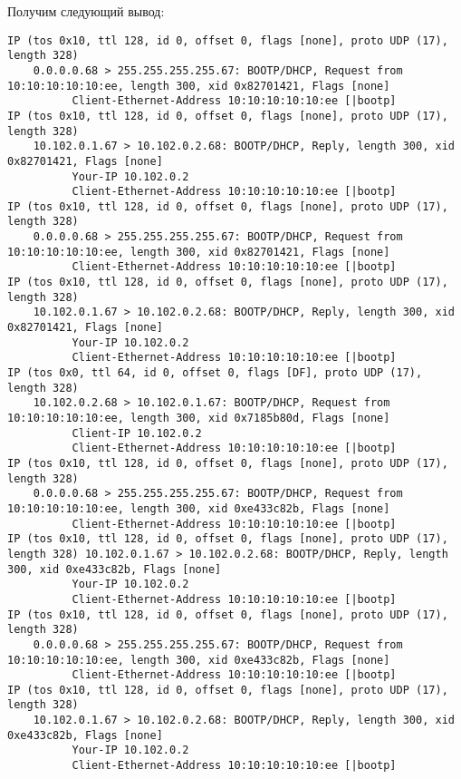 \documentclass[a4paper,12pt]{article}
\begin{document}
Получим следующий вывод:
\begin{Verbatim}
IP (tos 0x10, ttl 128, id 0, offset 0, flags [none], proto UDP (17), length 328) 
	0.0.0.0.68 > 255.255.255.255.67: BOOTP/DHCP, Request from 10:10:10:10:10:ee, length 300, xid 0x82701421, Flags [none]
          Client-Ethernet-Address 10:10:10:10:10:ee [|bootp]
IP (tos 0x10, ttl 128, id 0, offset 0, flags [none], proto UDP (17), length 328) 
	10.102.0.1.67 > 10.102.0.2.68: BOOTP/DHCP, Reply, length 300, xid 0x82701421, Flags [none]
          Your-IP 10.102.0.2
          Client-Ethernet-Address 10:10:10:10:10:ee [|bootp]
IP (tos 0x10, ttl 128, id 0, offset 0, flags [none], proto UDP (17), length 328) 
	0.0.0.0.68 > 255.255.255.255.67: BOOTP/DHCP, Request from 10:10:10:10:10:ee, length 300, xid 0x82701421, Flags [none]
          Client-Ethernet-Address 10:10:10:10:10:ee [|bootp]
IP (tos 0x10, ttl 128, id 0, offset 0, flags [none], proto UDP (17), length 328) 
	10.102.0.1.67 > 10.102.0.2.68: BOOTP/DHCP, Reply, length 300, xid 0x82701421, Flags [none]
          Your-IP 10.102.0.2
          Client-Ethernet-Address 10:10:10:10:10:ee [|bootp]
IP (tos 0x0, ttl 64, id 0, offset 0, flags [DF], proto UDP (17), length 328) 
	10.102.0.2.68 > 10.102.0.1.67: BOOTP/DHCP, Request from 10:10:10:10:10:ee, length 300, xid 0x7185b80d, Flags [none]
          Client-IP 10.102.0.2
          Client-Ethernet-Address 10:10:10:10:10:ee [|bootp]
IP (tos 0x10, ttl 128, id 0, offset 0, flags [none], proto UDP (17), length 328) 
	0.0.0.0.68 > 255.255.255.255.67: BOOTP/DHCP, Request from 10:10:10:10:10:ee, length 300, xid 0xe433c82b, Flags [none]
          Client-Ethernet-Address 10:10:10:10:10:ee [|bootp]
IP (tos 0x10, ttl 128, id 0, offset 0, flags [none], proto UDP (17), length 328) 10.102.0.1.67 > 10.102.0.2.68: BOOTP/DHCP, Reply, length 300, xid 0xe433c82b, Flags [none]
          Your-IP 10.102.0.2
          Client-Ethernet-Address 10:10:10:10:10:ee [|bootp]
IP (tos 0x10, ttl 128, id 0, offset 0, flags [none], proto UDP (17), length 328) 
	0.0.0.0.68 > 255.255.255.255.67: BOOTP/DHCP, Request from 10:10:10:10:10:ee, length 300, xid 0xe433c82b, Flags [none]
          Client-Ethernet-Address 10:10:10:10:10:ee [|bootp]
IP (tos 0x10, ttl 128, id 0, offset 0, flags [none], proto UDP (17), length 328) 
	10.102.0.1.67 > 10.102.0.2.68: BOOTP/DHCP, Reply, length 300, xid 0xe433c82b, Flags [none]
          Your-IP 10.102.0.2
          Client-Ethernet-Address 10:10:10:10:10:ee [|bootp]
\end{Verbatim}
\end{document}

